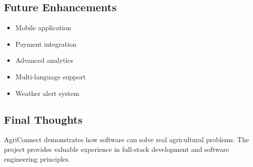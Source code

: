 \subsection{Future Enhancements}
\begin{itemize}[leftmargin=*]
	\item Mobile application
	\item Payment integration
	\item Advanced analytics
	\item Multi-language support
	\item Weather alert system
\end{itemize}

\subsection{Final Thoughts}
AgriConnect demonstrates how software can solve real agricultural problems. The project provides valuable experience in full-stack development and software engineering principles.
